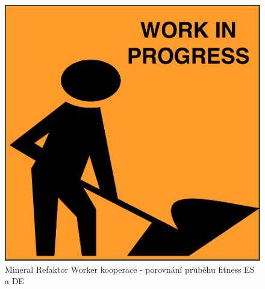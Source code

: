\begin{figure}[t]\centering
	\includegraphics[width=\columnwidth]{../img/todo}
	\caption{Mineral Refaktor Worker kooperace - porovnání průběhu fitness ES a DE}
	\label{obr04:MineralRefactorWorkerCoop}
\end{figure}
\clearpage

